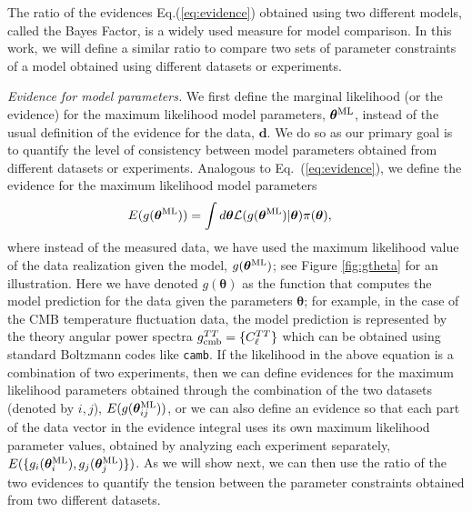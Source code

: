 \documentclass[amsmath, prl, reprint, aps]{revtex4-1}
\newcommand{\dv}{\textbf{d}}
\newcommand{\tv}{\bm{\theta}}
\newcommand{\tML}{\tv^{\rm ML}}
\newcommand{\saroj}[1]{\textcolor{blue}{(Saroj: #1)}}
\newcommand{\dragan}[1]{\textcolor{red}{(DH: #1)}}
\begin{document}
    The ratio of the evidences Eq.(\ref{eq:evidence}) obtained using two different models, called the Bayes Factor, is a widely used measure for model comparison. In this work, we will define a similar ratio to compare two sets of parameter constraints of a model obtained using different datasets or experiments. 
    
    \medskip
    \textit{Evidence for model parameters.}
    We first define the marginal likelihood (or the evidence) for the maximum likelihood model parameters, $\tML$, instead of the usual definition of the evidence for the data, $\dv$. We do so as our primary goal is to quantify the level of consistency between model parameters obtained from different datasets or experiments. Analogous to Eq.~(\ref{eq:evidence}), we define the evidence for the maximum likelihood model parameters
    \begin{align}
        E(g(\tML)) &= \int d\tv \mathcal{L}(g(\tML)|\tv) \pi(\tv),
    \end{align}
    where instead of the measured data, we have used the maximum likelihood value of the data realization given the model, $g(\tML)$; see Figure \ref{fig:gtheta} for an illustration. Here we have denoted $g(\tv)$ as the function that computes the model prediction for the data given the parameters $\tv$; for example, in the case of the CMB temperature fluctuation data, the model prediction is represented by the theory angular power spectra $g_{\rm cmb}^{TT} = \{C_\ell^{TT}\}$ which can be obtained using standard Boltzmann codes like \texttt{camb}. If the likelihood in the above equation is a combination of two experiments, then we can define evidences for the maximum likelihood parameters obtained through the combination of the two datasets (denoted by $i,j$), $E(g(\tML_{ij}))$, or we can also define an evidence so that each part of the data vector in the evidence integral uses its own maximum likelihood parameter values, obtained by analyzing each experiment separately, $E(\{g_i(\tML_i), g_j(\tML_j)\})$. As we will show next, we can then use the ratio of the two evidences to quantify the tension between the parameter constraints obtained from two different datasets.
    
\end{document}
